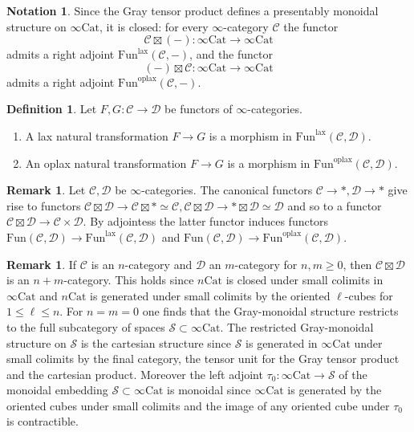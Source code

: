 \documentclass[10pt,oneside]{article}
\numberwithin{equation}{section} %
\numberwithin{figure}{section} %
\theoremstyle{plain}
\theoremstyle{definition}
\newtheorem{definition}[theorem]{Definition}
\newtheorem{notation}[theorem]{Notation}
\newtheorem{remark}[theorem]{Remark}
\newcommand{\mC}{{\mathcal C}}
\newcommand{\mD}{{\mathcal D}}
\newcommand{\mS}{{\mathcal S}}
\newcommand{\F}{{F}}
\newcommand{\G}{{G}}
\newcommand{\m}{{m}}
\newcommand{\n}{{n}}
\newcommand{\Cat}{\mathrm{Cat}}
\newcommand{\Fun}{\mathrm{Fun}}
\newcommand{\lax}{{\mathrm{lax}}}
\newcommand{\oplax}{{\mathrm{oplax}}}
\begin{document}
\begin{notation}
	
Since the Gray tensor product defines a presentably monoidal structure on $\infty\Cat$, it is closed: for every $\infty$-category $\mC$ the functor $$ \mC \boxtimes (-): \infty\Cat \to \infty\Cat$$ admits a right adjoint $\Fun^\lax(\mC,-)$, and the functor $$ (-) \boxtimes \mC : \infty\Cat \to \infty\Cat$$ admits a right adjoint $\Fun^\oplax(\mC,-)$.
\end{notation}

\begin{definition}Let $\F,\G:\mC \to \mD $ be functors of $\infty$-categories.
\begin{enumerate}[\normalfont(1)]\setlength{\itemsep}{-2pt}
\item A lax natural transformation $\F \to \G$ is a morphism in $\Fun^\lax(\mC,\mD)$.

\item An oplax natural transformation $\F \to \G$ is a morphism in $\Fun^\oplax(\mC,\mD)$.
\end{enumerate}
\end{definition}

\begin{remark}
	
Let $\mC,\mD$ be $\infty$-categories. The canonical functors $\mC \to *, \mD \to *$
give rise to functors $\mC \boxtimes \mD \to \mC \boxtimes * \simeq \mC, \mC \boxtimes \mD \to * \boxtimes \mD \simeq \mD$ and so to a functor $\mC \boxtimes \mD \to \mC \times \mD.$
By adjointess the latter functor induces functors
$ \Fun(\mC,\mD)\to \Fun^\lax(\mC,\mD)$ and $\Fun(\mC,\mD)\to \Fun^\oplax(\mC,\mD).$
\end{remark}

\begin{remark}\label{lao}\label{grayspace}
If $\mC$ is an $\n$-category and $\mD$ an $\m$-category for $\n,\m \geq 0$,
then $\mC \boxtimes \mD$ is an $\n+\m$-category.
This holds since $\n\Cat$ is closed under small colimits in $\infty\Cat$ and $\n\Cat$ is generated under small colimits by the oriented $\ell$-cubes for $1 \leq \ell \leq \n$.
For $n=m=0$ one finds that the Gray-monoidal structure restricts to the 
full subcategory of spaces $\mS \subset \infty\Cat$.
The restricted Gray-monoidal structure on $\mS$ is the cartesian structure since $\mS$ is generated in $\infty\Cat$ under small colimits by the final category, the tensor unit for the Gray tensor product and the cartesian product.
Moreover the left adjoint $\tau_0: \infty\Cat \to \mS$ of the monoidal embedding $\mS \subset \infty\Cat$ is monoidal since
$\infty\Cat$ is generated by the oriented cubes under small colimits and the image of any oriented cube under $\tau_0$ is contractible.

\end{remark}
\end{document}
